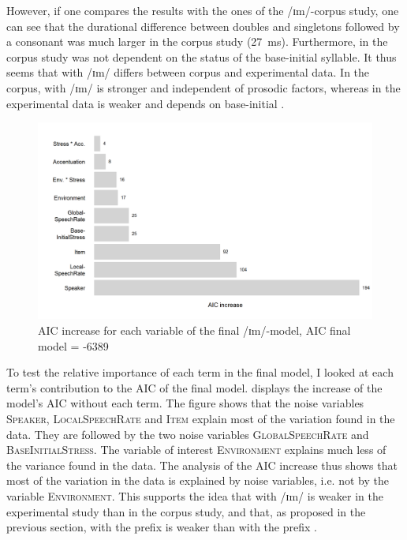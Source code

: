 However, if one compares the results with the ones of the /ɪm/-corpus study, one can see that the durational difference between doubles and singletons followed by a consonant was much larger in the corpus study (27~ms). Furthermore, in the corpus study  was not dependent on the  status of the base-initial syllable.
It thus seems that  with /ɪm/ differs between corpus and experimental data. In the corpus,  with /ɪm/ is stronger and independent of prosodic factors, whereas in the experimental data  is weaker and depends on base-initial .


 









\begin{figure}
	
	\includegraphics[scale=0.7]{images/Experiment/AICdecreaseImComplex.png}
	\caption{AIC increase for each variable of the final /ɪm/-model, AIC final model = -6389}
	\label{fig:Effectsize im experiment}
	
\end{figure}

To test the relative importance of each term in the final model, I looked at each term's contribution to the AIC of the final model.  displays the increase of the model's AIC  without each term. 
The figure shows that the noise variables \textsc{Speaker}, \textsc{LocalSpeechRate} and \textsc{Item} explain  most of the variation found in the data. They are followed by the two noise variables \textsc{GlobalSpeechRate} and \textsc{BaseInitialStress}. The variable of interest \textsc{Environment} explains much less of the variance found in the data. The analysis of the AIC increase thus shows that most of the variation in the data is explained by noise variables, i.e. not by the variable \textsc{Environment}. This supports the idea that  with /ɪm/ is weaker in the experimental study than in the corpus study, and that, as proposed in the previous section,  with the prefix  is weaker than  with the prefix  . 




